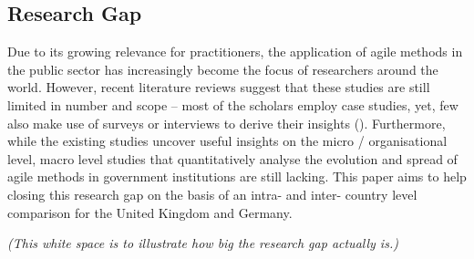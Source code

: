 \subsection{Research Gap}\label{Research Gap}
Due to its growing relevance for practitioners, the application of agile methods in the public sector has increasingly become the focus of researchers around the world. However, recent literature reviews suggest that these studies are still limited in number and scope – most of the scholars employ case studies, yet, few also make use of surveys or interviews to derive their insights (\cite{CarvalhoFernandes2016, Vacari2015, Mergel2018, Mergel}). Furthermore, while the existing studies uncover useful insights on the micro / organisational level, macro level studies that quantitatively analyse the evolution and spread of agile methods in government institutions are still lacking. This paper aims to help closing this research gap on the basis of an intra- and inter- country level comparison for the United Kingdom and Germany. 


\vspace{12cm}

\begin{center}
\tiny{\textit{(This white space is to illustrate how big the research gap actually is.)}}
\end{center}